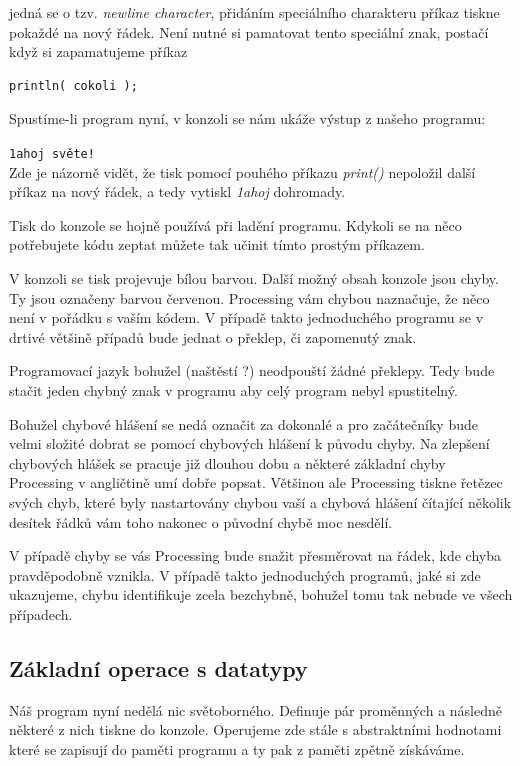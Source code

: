 \documentclass[10pt]{book}
\newcommand{\pododdil}[1]{\subsection{#1}\index{#1}\label{#1}}
\newcommand{\vyraz}[1]{\textit{\gls{#1}}\index{#1}\label{#1}}
\newcommand{\console}[1]{\texttt{\footnotesize #1}}
\begin{document}
jedná se o tzv. {\em newline character}, přidáním speciálního charakteru příkaz tiskne pokaždé na nový řádek. Není nutné si pamatovat tento speciální znak, postačí když si zapamatujeme příkaz 

\begin{lstlisting}
println( cokoli );

\end{lstlisting}

Spustíme-li program nyní, v konzoli se nám ukáže výstup z našeho programu:

\console{1ahoj světe!}\\

Zde je názorně vidět, že tisk pomocí pouhého příkazu \vyraz{print()} nepoložil další příkaz na nový řádek, a tedy vytiskl {\em 1ahoj} dohromady.

Tisk do konzole se hojně používá při ladění programu. Kdykoli se na něco potřebujete kódu zeptat můžete tak učinit tímto prostým příkazem.

V konzoli se tisk projevuje bílou barvou. Další možný obsah konzole jsou chyby. Ty jsou označeny barvou červenou. Processing vám chybou naznačuje, že něco není v pořádku s vaším kódem. V případě takto jednoduchého programu se v drtivé většině případů bude jednat o překlep, či zapomenutý znak.

Programovací jazyk bohužel (naštěstí ?) neodpouští žádné překlepy. Tedy bude stačit jeden chybný znak v programu aby celý program nebyl spustitelný.

Bohužel chybové hlášení se nedá označit za dokonalé a pro začátečníky bude velmi složité dobrat se pomocí chybových hlášení k původu chyby. Na zlepšení chybových hlášek se pracuje již dlouhou dobu a některé základní chyby Processing v angličtině umí dobře popsat. Většinou ale Processing tiskne řetězec svých chyb, které byly nastartovány chybou vaší a chybová hlášení čítající několik desítek řádků vám toho nakonec o původní chybě moc nesdělí.

V případě chyby se vás Processing bude snažit přesměrovat na řádek, kde chyba pravděpodobně vznikla. V případě takto jednoduchých programů, jaké si zde ukazujeme, chybu identifikuje zcela bezchybně, bohužel tomu tak nebude ve všech případech.


\pododdil{Základní operace s datatypy}

Náš program nyní nedělá nic světoborného. Definuje pár proměnných a následně některé z nich tiskne do konzole. Operujeme zde stále s abstraktními hodnotami které se zapisují do paměti programu a ty pak z paměti zpětně získáváme.
\end{document}
